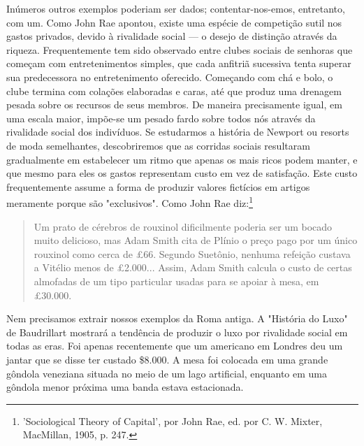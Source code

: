 \documentclass[12pt]{article}
\begin{document}
Inúmeros outros exemplos poderiam ser dados; contentar-nos-emos, entretanto, com um. Como John Rae apontou, existe uma espécie de competição sutil nos gastos privados, devido à rivalidade social — o desejo de distinção através da riqueza. Frequentemente tem sido observado entre clubes sociais de senhoras que começam com entretenimentos simples, que cada anfitriã sucessiva tenta superar sua predecessora no entretenimento oferecido. Começando com chá e bolo, o clube termina com colações elaboradas e caras, até que produz uma drenagem pesada sobre os recursos de seus membros. De maneira precisamente igual, em uma escala maior, impõe-se um pesado fardo sobre todos nós através da rivalidade social dos indivíduos. Se estudarmos a história de Newport ou resorts de moda semelhantes, descobriremos que as corridas sociais resultaram gradualmente em estabelecer um ritmo que apenas os mais ricos podem manter, e que mesmo para eles os gastos representam custo em vez de satisfação. Este custo frequentemente assume a forma de produzir valores fictícios em artigos meramente porque são "exclusivos". Como John Rae diz:\footnote{'Sociological Theory of Capital', por John Rae, ed. por C. W. Mixter, MacMillan, 1905, p. 247.}

\begin{quote}
Um prato de cérebros de rouxinol dificilmente poderia ser um bocado muito delicioso, mas Adam Smith cita de Plínio o preço pago por um único rouxinol como cerca de £66. Segundo Suetônio, nenhuma refeição custava a Vitélio menos de £2.000... Assim, Adam Smith calcula o custo de certas almofadas de um tipo particular usadas para se apoiar à mesa, em £30.000.
\end{quote}

Nem precisamos extrair nossos exemplos da Roma antiga. A "História do Luxo" de Baudrillart mostrará a tendência de produzir o luxo por rivalidade social em todas as eras. Foi apenas recentemente que um americano em Londres deu um jantar que se disse ter custado \$8.000. A mesa foi colocada em uma grande gôndola veneziana situada no meio de um lago artificial, enquanto em uma gôndola menor próxima uma banda estava estacionada.
\end{document}
